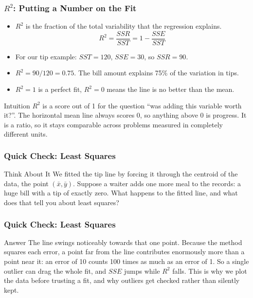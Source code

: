 \begin{frame}[fragile]\frametitle{$R^2$: Putting a Number on the Fit}
\begin{itemize}
\item $R^2$ is the fraction of the total variability that the regression explains.
\[
R^2 = \frac{SSR}{SST} = 1 - \frac{SSE}{SST}
\]
\item For our tip example: $SST = 120$, $SSE = 30$, so $SSR = 90$.
\item $R^2 = 90/120 = 0.75$. The bill amount explains 75\% of the variation in tips.
\item $R^2 = 1$ is a perfect fit, $R^2 = 0$ means the line is no better than the mean.
\end{itemize}

\begin{block}{Intuition}
$R^2$ is a score out of 1 for the question ``was adding this variable worth it?''. The horizontal mean line always scores 0, so anything above 0 is progress. It is a ratio, so it stays comparable across problems measured in completely different units.
\end{block}
\end{frame}

\begin{frame}[fragile]\frametitle{Quick Check: Least Squares}
\begin{block}{Think About It}
We fitted the tip line by forcing it through the centroid of the data, the point $(\bar{x}, \bar{y})$. Suppose a waiter adds one more meal to the records: a huge bill with a tip of exactly zero. What happens to the fitted line, and what does that tell you about least squares?
\end{block}
\end{frame}

\begin{frame}[fragile]\frametitle{Quick Check: Least Squares}
\begin{block}{Answer}
The line swings noticeably towards that one point. Because the method squares each error, a point far from the line contributes enormously more than a point near it: an error of 10 counts 100 times as much as an error of 1. So a single outlier can drag the whole fit, and $SSE$ jumps while $R^2$ falls. This is why we plot the data before trusting a fit, and why outliers get checked rather than silently kept.
\end{block}
\end{frame}


